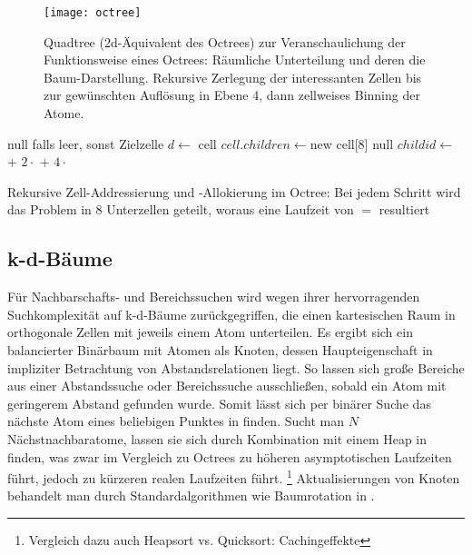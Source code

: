 \begin{figure}[tbhp]
  \centering
  \texttt{[image: octree]}
  \label{fig:octree}
  \caption[Funktionsweise eines Octrees]{Quadtree (2d-Äquivalent des Octrees) zur Veranschaulichung der Funktionsweise eines Octrees:
    Räumliche Unterteilung und deren die Baum-Darstellung.
    Rekursive Zerlegung der interessanten Zellen bis zur gewünschten Auflösung in Ebene 4, dann zellweises Binning der Atome.
  }
\end{figure}

\begin{algorithm}
  \begin{algorithmic}
    \Result null falls leer, sonst Zielzelle
    \State
    \State $d \gets $
    \State\Return cell
    \EndIf
    \State $cell.children \gets $new cell[8]
    \Else
    \State \Return null
    \EndIf
    \EndIf
    \State $childid \gets $
    + $2\cdot$
    + $4\cdot$
    \State \Return{}
    \EndFunction
  \end{algorithmic}
  \caption[Zell-Addressierung in Octrees]{Rekursive Zell-Addressierung und -Allokierung im Octree: Bei jedem Schritt wird das Problem in 8 Unterzellen geteilt, woraus eine Laufzeit von $=$ resultiert}
  \label{algo:octreeadressing}
\end{algorithm}


\subsection{k-d-Bäume}

Für Nachbarschafts- und Bereichssuchen wird wegen ihrer hervorragenden Suchkomplexität auf k-d-Bäume zurückgegriffen, die einen kartesischen Raum in orthogonale Zellen mit jeweils einem Atom unterteilen.
Es ergibt sich ein balancierter Binärbaum mit Atomen als Knoten, dessen Haupteigenschaft in impliziter Betrachtung von Abstandsrelationen liegt.
So lassen sich große Bereiche aus einer Abstandssuche oder Bereichssuche ausschließen, sobald ein Atom mit geringerem Abstand gefunden wurde.
Somit lässt sich per binärer Suche das nächste Atom eines beliebigen Punktes in  finden.
Sucht man $N$ Nächstnachbaratome, lassen sie sich durch Kombination mit einem Heap in  finden, was zwar im Vergleich zu Octrees zu höheren asymptotischen Laufzeiten führt, jedoch zu kürzeren realen Laufzeiten führt.
\footnote{Vergleich dazu auch Heapsort vs. Quicksort: Cachingeffekte}
Aktualisierungen von Knoten behandelt man durch Standardalgorithmen wie Baumrotation in .

